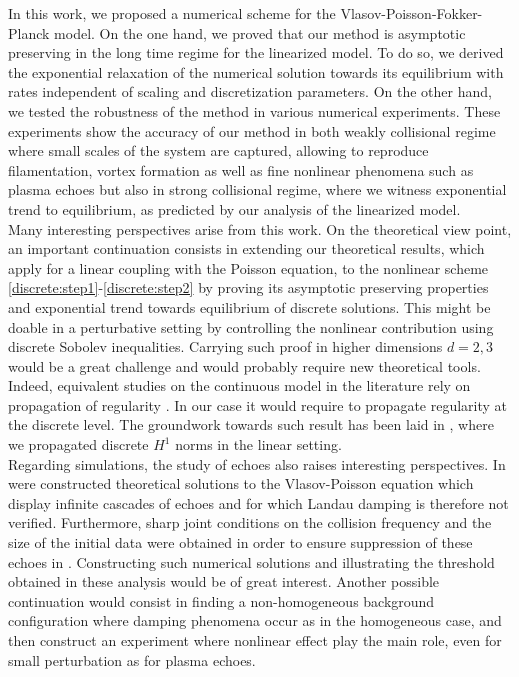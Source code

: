 \documentclass[11pt]{amsart}
\numberwithin{equation}{section}
\numberwithin{figure}{section}
\begin{document}
In this work, we proposed a numerical scheme for the Vlasov-Poisson-Fokker-Planck model. On the one hand, we proved that our method is asymptotic preserving in the long time regime for the linearized model. To do so, we derived the exponential relaxation of the numerical solution towards its equilibrium with rates independent of scaling and discretization parameters. On the other hand, we tested the robustness of the method in various numerical experiments. These experiments show the accuracy of our method in both weakly collisional regime where small scales of the system are captured, allowing to reproduce filamentation, vortex formation as well as fine nonlinear phenomena such as plasma echoes but also in strong collisional regime, where we witness exponential trend to equilibrium, as predicted by our analysis of the linearized model.\\
Many interesting perspectives arise from this work. On the theoretical
view point, an important continuation consists in extending our
theoretical results, which apply for a linear coupling with the
Poisson equation, to the nonlinear scheme
\eqref{discrete:step1}-\eqref{discrete:step2} by proving its
asymptotic preserving properties and exponential trend towards
equilibrium of discrete solutions. This might be doable in a
perturbative setting by controlling the nonlinear contribution using
discrete Sobolev inequalities. Carrying such proof in higher
dimensions $d=2,3$ would be a great challenge and would probably
require new theoretical tools. Indeed, equivalent studies on the
continuous model in the literature rely on propagation of regularity
\cite{Herau_Thomann16,Hwang_Jang13,liu18, Herda_Rodrigues}. In our case it would require to propagate regularity at the discrete level. The groundwork towards such result has been laid in \cite{BF_09_22}, where we propagated discrete $H^1$ norms in the linear setting.\\
Regarding simulations, the study of echoes also raises interesting perspectives. In \cite{Grenier_Toan_Rodnianski22} were constructed theoretical solutions to the Vlasov-Poisson equation which display infinite cascades of echoes and for which Landau damping is therefore not verified. Furthermore, sharp joint conditions on the collision frequency and the size of the initial data were obtained in order to ensure suppression of these echoes in \cite{Bedrossian17,Chaturvedi_Luk_Nguyen23}. Constructing such numerical solutions and illustrating the threshold obtained in these analysis would be of great interest. Another possible continuation would consist in finding a non-homogeneous background configuration where damping phenomena occur as in the homogeneous case, and then construct an experiment where nonlinear effect play the main role, even for small perturbation as for plasma echoes. 
\end{document}
